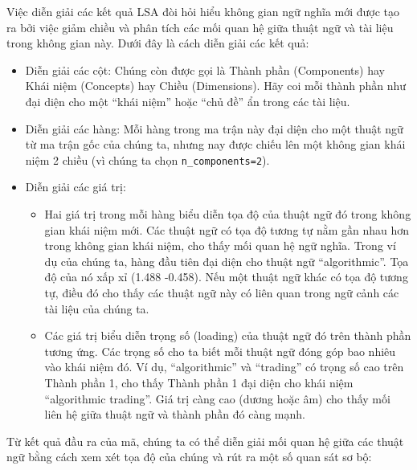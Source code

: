 Việc diễn giải các kết quả LSA đòi hỏi hiểu không gian ngữ nghĩa mới được tạo ra bởi việc giảm chiều và phân tích các mối quan hệ giữa thuật ngữ và tài liệu trong không gian này. Dưới đây là cách diễn giải các kết quả:

\begin{itemize}
  \item Diễn giải các cột: Chúng còn được gọi là Thành phần (Components) hay Khái niệm (Concepts) hay Chiều (Dimensions). Hãy coi mỗi thành phần như đại diện cho một ``khái niệm'' hoặc ``chủ đề'' ẩn trong các tài liệu.
  \item Diễn giải các hàng: Mỗi hàng trong ma trận này đại diện cho một thuật ngữ từ ma trận gốc của chúng ta, nhưng nay được chiếu lên một không gian khái niệm 2 chiều (vì chúng ta chọn \texttt{n\_components=2}).
  \item Diễn giải các giá trị:
  \begin{itemize}
    \item Hai giá trị trong mỗi hàng biểu diễn tọa độ của thuật ngữ đó trong không gian khái niệm mới. Các thuật ngữ có tọa độ tương tự nằm gần nhau hơn trong không gian khái niệm, cho thấy mối quan hệ ngữ nghĩa. Trong ví dụ của chúng ta, hàng đầu tiên đại diện cho thuật ngữ ``algorithmic''. Tọa độ của nó xấp xỉ (1.488 -0.458). Nếu một thuật ngữ khác có tọa độ tương tự, điều đó cho thấy các thuật ngữ này có liên quan trong ngữ cảnh các tài liệu của chúng ta.
    \item Các giá trị biểu diễn trọng số (loading) của thuật ngữ đó trên thành phần tương ứng. Các trọng số cho ta biết mỗi thuật ngữ đóng góp bao nhiêu vào khái niệm đó. Ví dụ, ``algorithmic'' và ``trading'' có trọng số cao trên Thành phần 1, cho thấy Thành phần 1 đại diện cho khái niệm ``algorithmic trading''. Giá trị càng cao (dương hoặc âm) cho thấy mối liên hệ giữa thuật ngữ và thành phần đó càng mạnh.
  \end{itemize}
\end{itemize}

Từ kết quả đầu ra của mã, chúng ta có thể diễn giải mối quan hệ giữa các thuật ngữ bằng cách xem xét tọa độ của chúng và rút ra một số quan sát sơ bộ:


